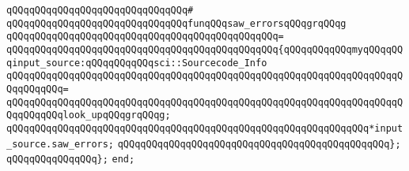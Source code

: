 \newline
\verb|qQQqqQQqqQQqqQQqqQQqqQQqqQQqqQQq#|\newline
\verb|qQQqqQQqqQQqqQQqqQQqqQQqqQQqqQQqfunqQQqsaw_errorsqQQqgrqQQqg|\newline
\verb|qQQqqQQqqQQqqQQqqQQqqQQqqQQqqQQqqQQqqQQqqQQqqQQq=|\newline
\verb|qQQqqQQqqQQqqQQqqQQqqQQqqQQqqQQqqQQqqQQqqQQqqQQq{qQQqqQQqqQQqmyqQQqqQQqinput_source:qQQqqQQqqQQqsci::Sourcecode_Info|\newline
\verb|qQQqqQQqqQQqqQQqqQQqqQQqqQQqqQQqqQQqqQQqqQQqqQQqqQQqqQQqqQQqqQQqqQQqqQQqqQQqqQQq=|\newline
\verb|qQQqqQQqqQQqqQQqqQQqqQQqqQQqqQQqqQQqqQQqqQQqqQQqqQQqqQQqqQQqqQQqqQQqqQQqqQQqqQQqlook_upqQQqgrqQQqg;|\newline
\newline
\verb|qQQqqQQqqQQqqQQqqQQqqQQqqQQqqQQqqQQqqQQqqQQqqQQqqQQqqQQqqQQqqQQq*input_source.saw_errors;|\newline
\verb|qQQqqQQqqQQqqQQqqQQqqQQqqQQqqQQqqQQqqQQqqQQqqQQq};|\newline
\verb|qQQqqQQqqQQqqQQq};|\newline
\verb|end;|\newline
\newline
\newline

